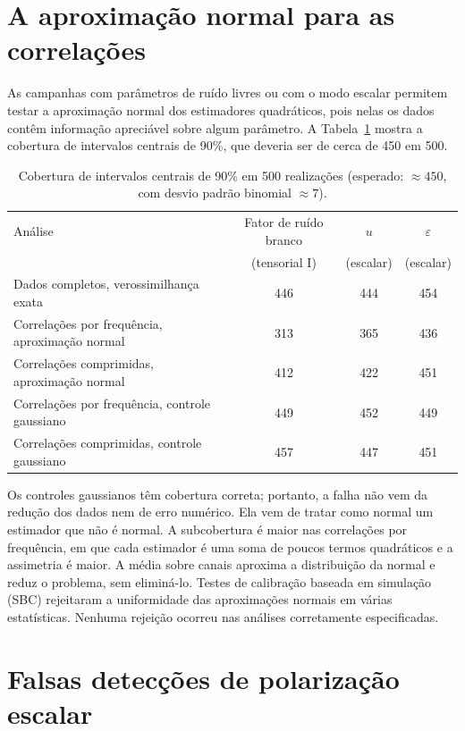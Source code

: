 \section{A aproximação normal para as correlações}

As campanhas com parâmetros de ruído livres ou com o modo escalar
permitem testar a aproximação normal dos estimadores quadráticos, pois
nelas os dados contêm informação apreciável sobre algum parâmetro. A
Tabela~\ref{tab:sim-cobertura} mostra a cobertura de intervalos centrais
de 90\%, que deveria ser de cerca de 450 em 500.

\begin{table}[htbp]
\centering
\caption{Cobertura de intervalos centrais de 90\% em 500 realizações
(esperado: $\approx450$, com desvio padrão binomial $\approx7$).}
\label{tab:sim-cobertura}
\small
\begin{tabular}{lccc}
\toprule
Análise & Fator de ruído branco & $u$ & $\varepsilon$\\
 & (tensorial I) & (escalar) & (escalar)\\
\midrule
Dados completos, verossimilhança exata & 446 & 444 & 454\\
Correlações por frequência, aproximação normal & 313 & 365 & 436\\
Correlações comprimidas, aproximação normal & 412 & 422 & 451\\
Correlações por frequência, controle gaussiano & 449 & 452 & 449\\
Correlações comprimidas, controle gaussiano & 457 & 447 & 451\\
\bottomrule
\end{tabular}
\end{table}

Os controles gaussianos têm cobertura correta; portanto, a falha não
vem da redução dos dados nem de erro numérico. Ela vem de tratar como
normal um estimador que não é normal. A subcobertura é maior nas
correlações por frequência, em que cada estimador é uma soma de poucos
termos quadráticos e a assimetria é maior. A média sobre canais
aproxima a distribuição da normal e reduz o problema, sem eliminá-lo.
Testes de calibração baseada em simulação (SBC) \autocite{talts2018}
rejeitaram a uniformidade das aproximações normais em várias
estatísticas. Nenhuma rejeição ocorreu nas análises corretamente
especificadas.

\section{Falsas detecções de polarização escalar}

